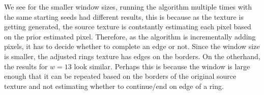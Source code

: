 \documentclass[12pt,twoside]{article}
\begin{document}
We see for the smaller window sizes, running the algorithm multiple times with the same starting seeds had different results, this is because as the texture is getting generated, the source texture is contstantly estimating each pixel based on the prior estimated pixel.  Therefore, as the algorithm is incrementally adding pixels, it has to decide whether to complete an edge or not.  Since the window size is smaller, the adjusted rings texture has edges on the borders.  On the otherhand, the results for $w=13$ look similar.  Perhaps this is because the window is large enough that it can be repeated based on the borders of the original source texture and not estimating whether to continue/end on edge of a ring. 
\end{document}
